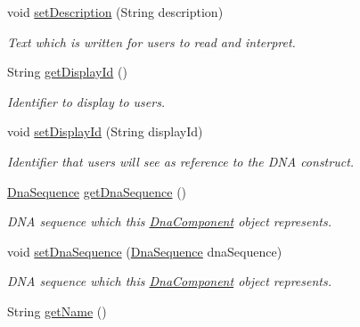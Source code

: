 \begin{DoxyCompactItemize}
void \hyperlink{interfaceorg_1_1sbolstandard_1_1core_1_1_dna_component_a1d15d718177c4f5411ce6ab339889fd4}{setDescription} (String description)
\begin{DoxyCompactList}\small\item\em Text which is written for users to read and interpret. \item\end{DoxyCompactList}\item 
String \hyperlink{interfaceorg_1_1sbolstandard_1_1core_1_1_dna_component_aefe76199cb4d0096f487b280c411d843}{getDisplayId} ()
\begin{DoxyCompactList}\small\item\em Identifier to display to users. \item\end{DoxyCompactList}\item 
void \hyperlink{interfaceorg_1_1sbolstandard_1_1core_1_1_dna_component_a46b93a70e7bd612a7b429aac4829bc88}{setDisplayId} (String displayId)
\begin{DoxyCompactList}\small\item\em Identifier that users will see as reference to the DNA construct. \item\end{DoxyCompactList}\item 
\hyperlink{interfaceorg_1_1sbolstandard_1_1core_1_1_dna_sequence}{DnaSequence} \hyperlink{interfaceorg_1_1sbolstandard_1_1core_1_1_dna_component_a596826001de0d3a682c2effa7fd6d50d}{getDnaSequence} ()
\begin{DoxyCompactList}\small\item\em DNA sequence which this \hyperlink{interfaceorg_1_1sbolstandard_1_1core_1_1_dna_component}{DnaComponent} object represents. \item\end{DoxyCompactList}\item 
void \hyperlink{interfaceorg_1_1sbolstandard_1_1core_1_1_dna_component_a2e16af0dece16378b9ee31d818bd8ef1}{setDnaSequence} (\hyperlink{interfaceorg_1_1sbolstandard_1_1core_1_1_dna_sequence}{DnaSequence} dnaSequence)
\begin{DoxyCompactList}\small\item\em DNA sequence which this \hyperlink{interfaceorg_1_1sbolstandard_1_1core_1_1_dna_component}{DnaComponent} object represents. \item\end{DoxyCompactList}\item 
String \hyperlink{interfaceorg_1_1sbolstandard_1_1core_1_1_dna_component_a78ee178b6a73658d65ca60da4d1e6683}{getName} ()

\end{DoxyCompactItemize}
